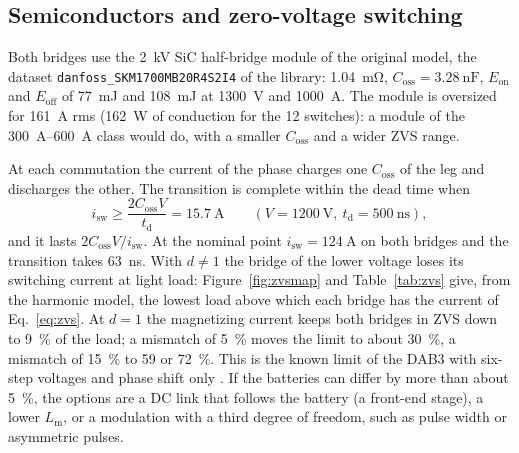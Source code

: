 \documentclass[12pt,a4paper]{scrartcl}
\newcommand{\ped}[1]{_{\mathrm{#1}}}
\newcommand{\code}[1]{\texttt{#1}}
\begin{document}
\begin{onehalfspace}
\subsection{Semiconductors and zero-voltage switching}
\label{sec:semi}

Both bridges use the \SI{2}{\kilo\volt} SiC half-bridge module of the original model, the dataset \code{danfoss\_SKM1700MB20R4S2I4} of the library: \SI{1.04}{\milli\ohm}, $C\ped{oss} = \SI{3.28}{\nano\farad}$, $E\ped{on}$ and $E\ped{off}$ of \SI{77}{\milli\joule} and \SI{108}{\milli\joule} at \SI{1300}{\volt} and \SI{1000}{\ampere}. The module is oversized for \SI{161}{\ampere} rms (\SI{162}{\watt} of conduction for the 12 switches): a module of the \SIrange{300}{600}{\ampere} class would do, with a smaller $C\ped{oss}$ and a wider ZVS range.

At each commutation the current of the phase charges one $C\ped{oss}$ of the leg and discharges the other. The transition is complete within the dead time when
\begin{equation}
	i\ped{sw} \ge \frac{2 C\ped{oss} V}{t\ped{d}} = \SI{15.7}{\ampere} \qquad (V = \SI{1200}{\volt},\ t\ped{d} = \SI{500}{\nano\second}),
	\label{eq:zvs}
\end{equation}
and it lasts $2 C\ped{oss} V/i\ped{sw}$. At the nominal point $i\ped{sw} = \SI{124}{\ampere}$ on both bridges and the transition takes \SI{63}{\nano\second}. With $d \ne 1$ the bridge of the lower voltage loses its switching current at light load: Figure~\ref{fig:zvsmap} and Table~\ref{tab:zvs} give, from the harmonic model, the lowest load above which each bridge has the current of Eq.~\eqref{eq:zvs}. At $d = 1$ the magnetizing current keeps both bridges in ZVS down to \SI{9}{\percent} of the load; a mismatch of \SI{5}{\percent} moves the limit to about \SI{30}{\percent}, a mismatch of \SI{15}{\percent} to 59 or \SI{72}{\percent}. This is the known limit of the DAB3 with six-step voltages and phase shift only \cite{dedoncker1991}. If the batteries can differ by more than about \SI{5}{\percent}, the options are a DC link that follows the battery (a front-end stage), a lower $L\ped{m}$, or a modulation with a third degree of freedom, such as pulse width or asymmetric pulses.


\end{onehalfspace}
\end{document}
